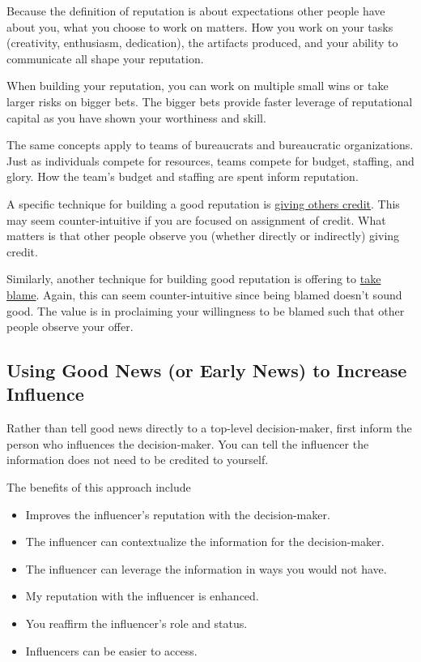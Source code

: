 Because the definition of reputation is about expectations other people have about you, what you choose to work on matters. How you work on your tasks (creativity, enthusiasm, dedication), the artifacts produced, and your ability to communicate all shape your reputation. 

When building your reputation, you can work on multiple small wins or take larger risks on bigger bets. The bigger bets provide faster leverage of reputational capital as you have shown your worthiness and skill. 

The same concepts apply to teams of bureaucrats and bureaucratic organizations. Just as individuals compete for resources, teams compete for budget, staffing, and glory. How the team's budget and staffing are spent inform reputation. 

A specific technique for building a good reputation is 
\hyperref[sec:credit-others]{giving others credit}. 
This may seem counter-intuitive if you are focused on assignment of credit. What  matters is that other people observe you (whether directly or indirectly) giving credit. 

Similarly, another technique for building good reputation is offering to \hyperref[sec:take-blame]{take blame}.
Again, this can seem counter-intuitive since being blamed doesn't sound good. The value is in proclaiming your willingness to be blamed such that other people observe your offer. 

\subsection*{Using Good News (or Early News) to Increase Influence}

Rather than tell good news directly to a top-level decision-maker, first inform the person who influences the decision-maker.
You can tell the influencer the information does not need to be credited to yourself.

The benefits of this approach include
\begin{itemize}
    \item Improves the influencer's reputation with the decision-maker.
    \item The influencer can contextualize the information for the decision-maker.
    \item The influencer can leverage the information in ways you would not have.
    \item My reputation with the influencer is enhanced.
    \item You reaffirm the influencer's role and status.
    \item Influencers can be easier to access.
\end{itemize}


